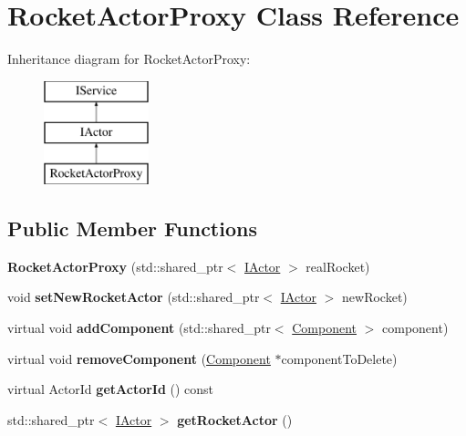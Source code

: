 \hypertarget{classRocketActorProxy}{}\section{Rocket\+Actor\+Proxy Class Reference}
\label{classRocketActorProxy}
Inheritance diagram for Rocket\+Actor\+Proxy\+:\begin{figure}[H]
\begin{center}
\leavevmode
\includegraphics[height=3.000000cm]{classRocketActorProxy}
\end{center}
\end{figure}
\subsection*{Public Member Functions}
\begin{DoxyCompactItemize}
\item 
{\bfseries Rocket\+Actor\+Proxy} (std\+::shared\+\_\+ptr$<$ \hyperlink{classIActor}{I\+Actor} $>$ real\+Rocket)\hypertarget{classRocketActorProxy_a4661a3680926b3dbce54042cf221cf6d}{}\label{classRocketActorProxy_a4661a3680926b3dbce54042cf221cf6d}

\item 
void {\bfseries set\+New\+Rocket\+Actor} (std\+::shared\+\_\+ptr$<$ \hyperlink{classIActor}{I\+Actor} $>$ new\+Rocket)\hypertarget{classRocketActorProxy_acbb5548c72794e91da07ef7725556008}{}\label{classRocketActorProxy_acbb5548c72794e91da07ef7725556008}

\item 
virtual void {\bfseries add\+Component} (std\+::shared\+\_\+ptr$<$ \hyperlink{classComponent}{Component} $>$ component)\hypertarget{classRocketActorProxy_a3c265c605adf8e73b46b7fef54f7880d}{}\label{classRocketActorProxy_a3c265c605adf8e73b46b7fef54f7880d}

\item 
virtual void {\bfseries remove\+Component} (\hyperlink{classComponent}{Component} $\ast$component\+To\+Delete)\hypertarget{classRocketActorProxy_a9a7d8920f9ede18c01f4d225c51ca47d}{}\label{classRocketActorProxy_a9a7d8920f9ede18c01f4d225c51ca47d}

\item 
virtual Actor\+Id {\bfseries get\+Actor\+Id} () const \hypertarget{classRocketActorProxy_aa9a6be1e5ffad1536b3f4dea8d7ae182}{}\label{classRocketActorProxy_aa9a6be1e5ffad1536b3f4dea8d7ae182}

\item 
std\+::shared\+\_\+ptr$<$ \hyperlink{classIActor}{I\+Actor} $>$ {\bfseries get\+Rocket\+Actor} ()\hypertarget{classRocketActorProxy_a98b7aab8854e75fbd6547446fd0e6709}{}\label{classRocketActorProxy_a98b7aab8854e75fbd6547446fd0e6709}

\end{DoxyCompactItemize}
